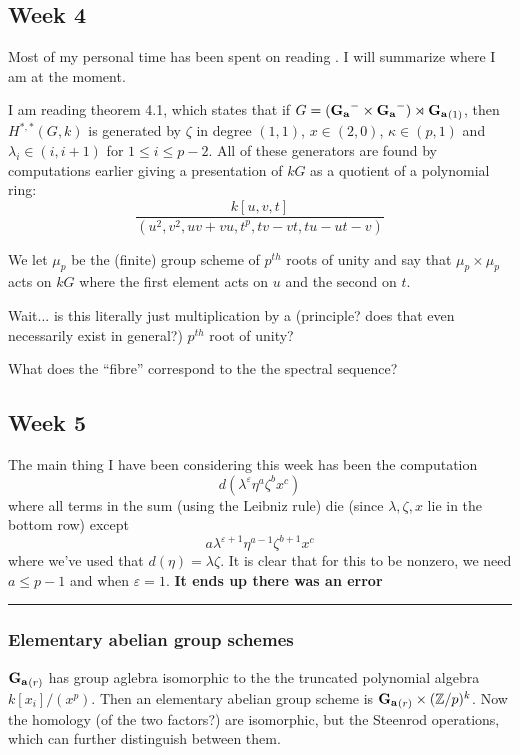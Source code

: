 \documentclass[12pt]{article}
\theoremstyle{nonumberbreak}
\theoremstyle{changebreak}
\theoremstyle{nonumberplain}
\theoremstyle{change}
\newcommand*{\bbZ}{\mathbb{Z}}
\newcommand*{\Ga}{\ensuremath\mathbf{G_a}}
\newcommand*{\brk}{
\rule{2in}{.1pt}
}
\begin{document}
\subsection{Week 4}
Most of my personal time has been spent on reading \cite{julia-dave}. I will summarize where I am at the moment.

I am reading theorem 4.1, which states that if $G=(\Ga^-\times \Ga^-)\rtimes \Ga_{(1)}$, then $H^{\ast,\ast}(G,k)$
is generated by $\zeta$ in degree $(1,1)$, $x\in(2,0)$, $\kappa\in(p,1)$ and $\lambda_i\in (i,i+1)$ for $1\le i\le p-2$.
All of these generators are found by computations earlier giving a presentation of $kG$ as a quotient of a polynomial ring:
\[\frac{k[u,v,t]}{(u^2,v^2,uv+vu,t^p, tv-vt, tu-ut-v)}\]

\begin{qst}
	We let $\mu_p$ be the (finite) group scheme of $p^{th}$ roots of unity and say that $\mu_p\times\mu_p$
	acts on $kG$ where the first element acts on $u$ and the second on $t$.
\end{qst}
Wait... is this literally just multiplication by a (principle? does that even necessarily exist in general?) $p^{th}$ root of unity?

\begin{qst}
	What does the ``fibre'' correspond to the the spectral sequence?
\end{qst}

\subsection{Week 5}
The main thing I have been considering this week has been the computation
\[d(\lambda^\varepsilon\eta^a\zeta^bx^c)\]
where all terms in the sum (using the Leibniz rule) die (since $\lambda,\zeta,x$ lie in the bottom row) except 
\[a\lambda^{\varepsilon+1}\eta^{a-1}\zeta^{b+1}x^c\]
where we've used that $d(\eta)=\lambda\zeta$. It is clear that for this to be nonzero, we need $a\le p-1$
and when $\varepsilon=1$. \textbf{It ends up there was an error}

\brk

\subsubsection{Elementary abelian group schemes}
$\Ga_{(r)}$ has group aglebra isomorphic to the the truncated polynomial algebra $k[x_i]/(x^p)$. Then an elementary abelian
group scheme is $\Ga_{(r)}\times(\bbZ/p)^k$. Now the homology (of the two factors?) are isomorphic, but
the Steenrod operations, which can further distinguish between them.
\end{document}
